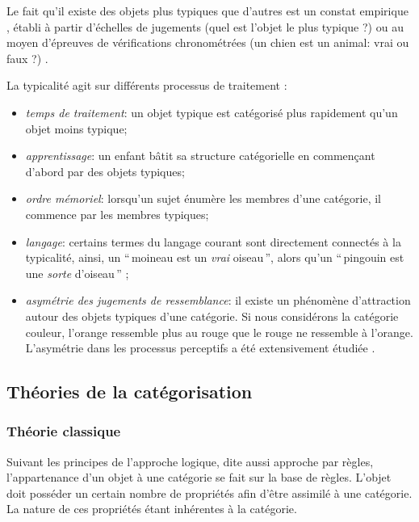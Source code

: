 {Le fait qu'il existe des objets plus typiques que d'autres est un constat empirique \citep[p. 37]{rosch1978cognition,mervis1981categorization}, établi à partir d'échelles de jugements (quel est l'objet le plus typique ?) ou au moyen d'épreuves de vérifications chronométrées (un chien est un animal: vrai ou faux ?) \citep[p. 41]{dubois1991semantique}.

La typicalité agit sur différents processus de traitement \citep[p. 51]{Houix03f,mervis1981categorization}:

\begin{itemize}
\item \emph{temps de traitement}: un objet typique est catégorisé plus rapidement qu'un objet moins typique;
\item \emph{apprentissage}: un enfant bâtit sa structure catégorielle en commençant d'abord par des objets typiques;
\item \emph{ordre mémoriel}: lorsqu'un sujet énumère les membres d'une catégorie, il commence par les membres typiques;
\item \emph{langage}: certains termes du langage courant sont directement connectés à la typicalité, ainsi, un ``\,moineau est un \emph{vrai} oiseau\,'', alors qu'un ``\,pingouin est une \emph{sorte} d'oiseau\,'' \citep{mervis1981categorization};
\item \emph{asymétrie des jugements de ressemblance}: il existe un phénomène d'attraction autour des objets typiques d'une catégorie. Si nous considérons la catégorie couleur, l’orange ressemble plus au rouge que le rouge ne ressemble à l'orange. L'asymétrie dans les processus perceptifs a été extensivement étudiée \citep{tversky1977features,krumhansl1978concerning}.
\end{itemize}


\subsection{Théories de la catégorisation}

\subsubsection{Théorie classique}

Suivant les principes de l'approche logique, dite aussi approche par règles, l'appartenance d'un objet à une catégorie se fait sur la base de règles. L'objet doit posséder un certain nombre de propriétés afin d'être assimilé à une catégorie. La nature de ces propriétés étant inhérentes à la catégorie.

}
